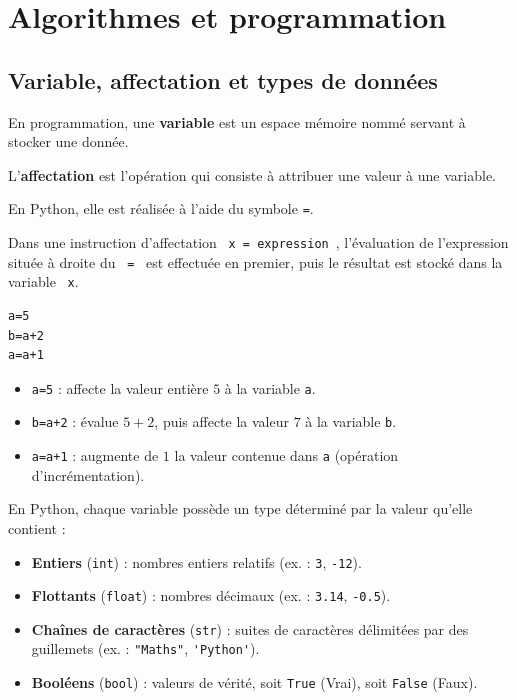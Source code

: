 \chapter{Algorithmes et programmation}

\section{Variable, affectation et types de données}

\begin{defin}
	En programmation, une \textbf{variable} est un espace mémoire nommé servant à stocker une donnée.

	L'\textbf{affectation} est l'opération qui consiste à attribuer une valeur à une variable.

	En Python, elle est réalisée à l'aide du symbole \lstinline|=|.
\end{defin}

\begin{remarque}
	Dans une instruction d'affectation ~\lstinline|x = expression|~, l'évaluation de l'expression située à droite du ~\lstinline|=|~ est effectuée en premier, puis le résultat est stocké dans la variable ~\lstinline|x|.
\end{remarque}

\begin{ex}
	\nline
	\begin{lstlisting}
a=5
b=a+2
a=a+1
\end{lstlisting}

	\begin{itemize}
		\item \lstinline|a=5| : affecte la valeur entière $5$ à la variable \lstinline|a|.
		\item \lstinline|b=a+2| : évalue $5 + 2$, puis affecte la valeur $7$ à la variable \lstinline|b|.
		\item \lstinline|a=a+1| : augmente de $1$ la valeur contenue dans \lstinline|a| (opération d'incrémentation).
	\end{itemize}
\end{ex}

\begin{prop}
	En Python, chaque variable possède un type déterminé par la valeur qu'elle contient :
	\begin{itemize}
		\item \textbf{Entiers} (\lstinline|int|) : nombres entiers relatifs (ex. : \lstinline|3|, \lstinline|-12|).
		\item \textbf{Flottants} (\lstinline|float|) : nombres décimaux (ex. : \lstinline|3.14|, \lstinline|-0.5|).
		\item \textbf{Chaînes de caractères} (\lstinline|str|) : suites de caractères délimitées par des guillemets (ex. : \lstinline|"Maths"|, \lstinline|'Python'|).
		\item \textbf{Booléens} (\lstinline|bool|) : valeurs de vérité, soit \lstinline|True| (Vrai), soit \lstinline|False| (Faux).
	\end{itemize}
\end{prop}

